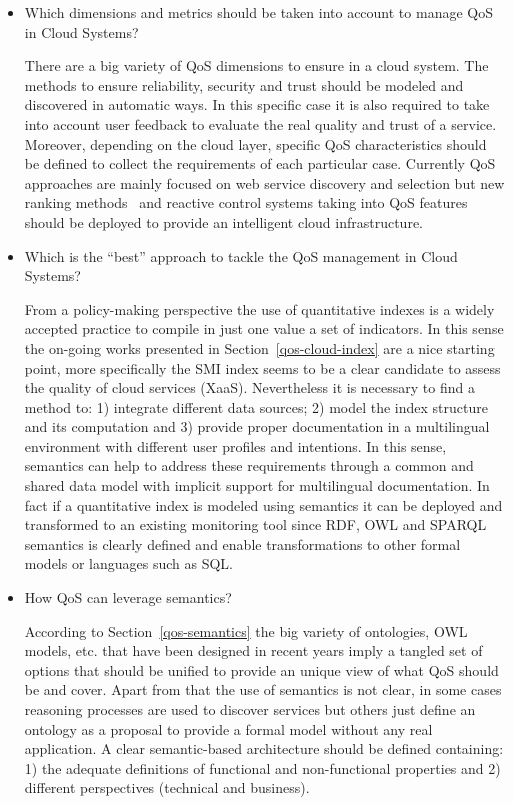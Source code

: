 \begin{itemize}

 \item Which dimensions and metrics should be taken into account to manage QoS in Cloud Systems?
 
There are a big variety of QoS dimensions to ensure in a cloud system. 
The methods to ensure reliability, security and trust should be modeled and 
discovered in automatic ways. In this specific case it is also required to take 
into account user feedback to evaluate the real quality and trust of a service. 
Moreover, depending on the cloud layer, specific QoS characteristics should be 
defined to collect the requirements of each particular case. Currently QoS 
approaches are mainly focused on web service discovery and selection but new 
ranking methods~\cite{DBLP:journals/fgcs/GargVB13} and reactive control systems taking into QoS features should be 
deployed to provide an intelligent cloud infrastructure.  

\item Which is the ``best'' approach to tackle the QoS management in Cloud Systems?

From a policy-making perspective the use of quantitative indexes is a widely accepted 
practice to compile in just one value a set of indicators. In this sense the on-going 
works presented in Section~\ref{qos-cloud-index} are a nice starting point, more specifically 
the SMI index seems to be a clear candidate to assess the quality of cloud services (XaaS). 
Nevertheless it is necessary to find a method to: 1) integrate different data sources; 
2) model the index structure and its computation and 3) provide proper documentation 
in a multilingual environment with different user profiles and intentions. In this sense, 
semantics can help to address these requirements through a common and shared data model 
with implicit support for multilingual documentation. In fact if a quantitative index 
is modeled using semantics it can be deployed and transformed to an existing monitoring 
tool since RDF, OWL and SPARQL semantics is clearly defined and enable transformations 
to other formal models or languages such as SQL.

\item How QoS can leverage semantics?

According to Section~\ref{qos-semantics} the big variety of ontologies, OWL models, etc. that 
have been designed in recent years imply a tangled set of options that should be 
unified to provide an unique view of what QoS should be and cover. Apart from that the 
use of semantics is not clear, in some cases reasoning processes are used to 
discover services but others just define an ontology as a proposal to provide a 
formal model without any real application. A clear semantic-based architecture 
should be defined containing: 1) the adequate definitions of 
functional and non-functional properties and 2) different perspectives (technical and business).


\end{itemize}
